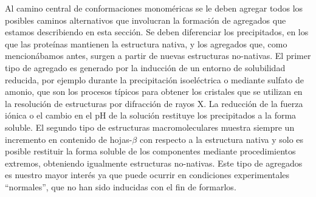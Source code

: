 Al camino central de conformaciones monoméricas se le deben agregar todos los posibles caminos alternativos que involucran la formación de agregados que estamos describiendo en esta sección.
Se deben diferenciar los precipitados, en los que las proteínas mantienen la estructura nativa, y los agregados que, como mencionábamos antes, surgen a partir de nuevas estructuras no-nativas.
El primer tipo de agregado es generado por la inducción de un entorno de solubilidad reducida, por ejemplo durante la precipitación isoeléctrica o mediante sulfato de amonio,
que son los procesos típicos para obtener los cristales que se utilizan en la resolución de estructuras por difracción de rayos X. 
La reducción de la fuerza iónica o el cambio en el pH de la solución restituye los precipitados a la forma soluble.
El segundo tipo de estructuras macromoleculares muestra siempre un incremento en contenido de hojas-$\beta$ con respecto a la estructura nativa y solo es posible restituir 
la forma soluble de los componentes mediante procedimientos extremos, obteniendo igualmente estructuras no-nativas.
Este tipo de agregados es nuestro mayor interés ya que puede ocurrir en condiciones experimentales ``normales'', que no han sido inducidas con el fin de formarlos.


















